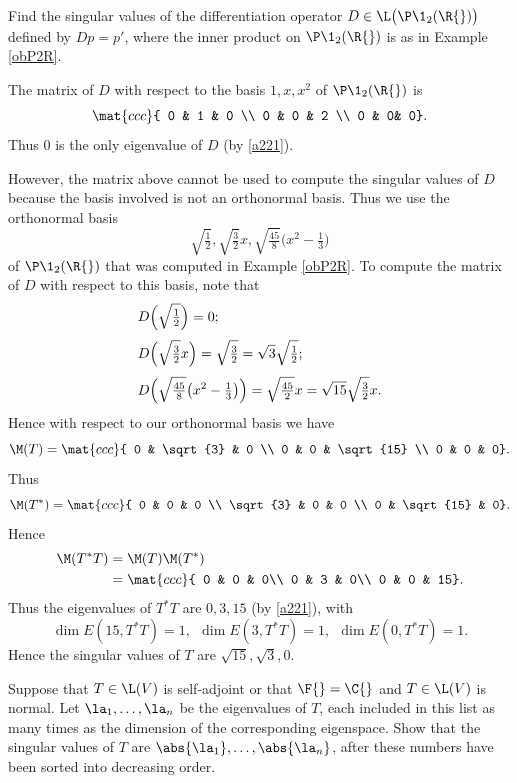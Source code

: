 \exercise
Find the singular values of the differentiation operator $D \in \L\bigl(\P\1_2(\R{})\bigr)$ defined by $Dp = p'\!$, where the inner product on $\P\1_2(\R{})$ is as in Example \ref{obP2R}.

\begin{Solution}
The matrix of $D$ with respect to the basis $1, x, x^2$ of $\P\1_2(\R{})$ is
\[
\mat{ccc}{
0 & 1 & 0 \\
0 & 0 & 2 \\
0 & 0& 0}.
\]
Thus $0$ is the only eigenvalue of $D$ (by \ref{a221}).

However, the matrix above cannot be used to compute the singular values of $D$ because the basis involved is not an orthonormal basis. Thus we use the orthonormal basis
\[
\sqrt{\tfrac{1}{2}}, \sqrt{\tfrac{3}{2}} x,
\sqrt{\tfrac{45}{8}} \bigl( x^2 - \tfrac{1}{3} \bigr)
\]
of $\P\1_2(\R{})$ that was computed in Example \ref{obP2R}. To compute the matrix of $D$ with respect to this basis, note that
\begin{align*}
&D\Bigl( \sqrt{\tfrac{1}{2}} \Bigr) = 0;\\[3bp]
&D\Bigl(\sqrt{\tfrac{3}{2}} x\Bigr) = \sqrt{\tfrac{3}{2}} = \sqrt{3} \sqrt{\tfrac{1}{2}} ;\\[3bp]
&D\Bigl( \sqrt{\tfrac{45}{8}} \bigl( x^2 - \tfrac{1}{3}\bigr) \Bigr) = \sqrt{ \tfrac{45}{2} } x = \sqrt{15} \sqrt{\tfrac{3}{2}} x.
\end{align*}
Hence with respect to our orthonormal basis we have
\[
\M(T) = \mat{ccc}{
0 & \sqrt{3} & 0 \\
0 & 0 & \sqrt{15} \\
0 & 0 & 0}.
\]
Thus
\[
\M(T^*) = \mat{ccc}{
0 & 0 & 0 \\
\sqrt{3} & 0 & 0 \\
0 & \sqrt{15} & 0}.
\]
Hence
\begin{align*}
\M(T^* T) &= \M(T) \M(T^*) \\
&= \mat{ccc}{
0 & 0 & 0\\
0 & 3 & 0\\
0 & 0 & 15}.
\end{align*}
Thus the eigenvalues of $T^* T$ are $0, 3, 15$ (by \ref{a221}), with
\[
\dim E(15, T^*T) = 1, \ \  \dim E(3, T^*T) = 1, \ \  \dim E(0, T^*T) = 1.
\]
Hence the singular values of $T$ are $\sqrt{15}, \sqrt{3}, 0$.
\end{Solution}

\exercise
Suppose that $T \in \L(V)$ is self-adjoint or that $\F{}= \C{}$ and $T \in \L(V)$ is normal. Let $\la_1, \ldots, \la_n$ be the eigenvalues of $T$, each included in this list as many times as the dimension of the corresponding eigenspace. Show that the singular values of $T$ are
$\abs{\la_1}, \ldots, \abs{\la_n}$, after these numbers have been sorted into decreasing order.\label{7singsp}

